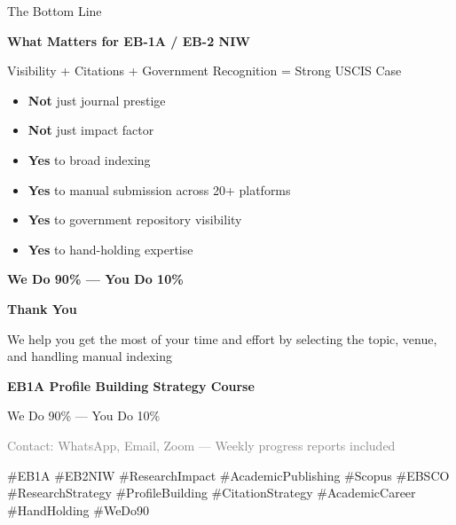 \documentclass[10pt, aspectratio=169]{beamer}
\begin{document}
	\begin{frame}{The Bottom Line}
		\begin{center}
			\Large{\textbf{What Matters for EB-1A / EB-2 NIW}}
		\end{center}
		
		\vspace{0.5cm}
		\begin{block}{\textcolor{myblue}{Visibility + Citations + Government Recognition = Strong USCIS Case}}
			\begin{itemize}
				\item \textbf{Not} just journal prestige
				\item \textbf{Not} just impact factor
				\item \textbf{Yes} to broad indexing
				\item \textbf{Yes} to manual submission across 20+ platforms
				\item \textbf{Yes} to government repository visibility
				\item \textbf{Yes} to hand-holding expertise
			\end{itemize}
		\end{block}
		
		\begin{center}
			\textcolor{myorange}{\Large \textbf{We Do 90\% — You Do 10\%}}
	
		\end{center}
	\end{frame}
	
	\begin{frame}[plain]
		\begin{center}
			\Huge{\textbf{Thank You}}
			\vspace{1cm}
			
			\Large{We help you get the most of your time and effort by selecting the topic, venue, and handling manual indexing}
			
			\vspace{0.5cm}
			\Large{\textbf{EB1A Profile Building Strategy Course}}
			
			\vspace{0.5cm}
			\textcolor{myblue}{\Large{We Do 90\% — You Do 10\%}}
			
			\vspace{0.3cm}
			\tiny{\textcolor{gray}{Contact: WhatsApp, Email, Zoom — Weekly progress reports included}}
			
			\vspace{1cm}
			\tiny{\#EB1A \#EB2NIW \#ResearchImpact \#AcademicPublishing \#Scopus \#EBSCO \#ResearchStrategy \#ProfileBuilding \#CitationStrategy \#AcademicCareer \#HandHolding \#WeDo90}
		\end{center}
	\end{frame}
	
\end{document}
